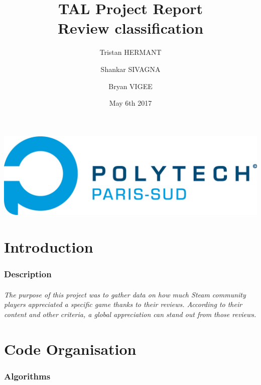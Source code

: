 \documentclass[paper=a4,fontsize=12pt]{report}
\title{TAL Project Report
\\Review classification}
\author{Tristan HERMANT
\and
Shankar SIVAGNA
\and
Bryan VIGEE}
\date{May 6th 2017}
\begin{document}
\maketitle
\begin{center}
\includegraphics{POLYTECH_PARIS-SUD_RVB.jpg}
\end{center}
\tableofcontents

\part{Introduction}
\section{Description}
\paragraph{The purpose of this project was to gather data on how much Steam community players appreciated a specific game thanks to their reviews. According to their content and other criteria, a global appreciation can stand out from those reviews.}

\part{Code Organisation}
\section{Algorithms}
\end{document}
